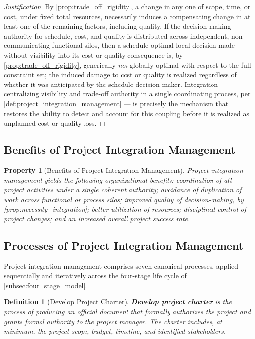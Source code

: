 \documentclass[12pt, a4paper]{report}
\theoremstyle{engnotes}
\newtheorem{defn}{Definition}[section]
\newtheorem{property}{Property}[section]
\begin{document}
\begin{proof}[Justification]
    By \cref{prop:trade_off_rigidity}, a change in any one of scope, time, or cost, under fixed total resources, necessarily induces a compensating change in at least one of the remaining factors, including quality. If the decision-making authority for schedule, cost, and quality is distributed across independent, non-communicating functional silos, then a schedule-optimal local decision made without visibility into its cost or quality consequence is, by \cref{prop:trade_off_rigidity}, generically \emph{not} globally optimal with respect to the full constraint set; the induced damage to cost or quality is realized regardless of whether it was anticipated by the schedule decision-maker. Integration --- centralizing visibility and trade-off authority in a single coordinating process, per \cref{def:project_integration_management} --- is precisely the mechanism that restores the ability to detect and account for this coupling before it is realized as unplanned cost or quality loss.
\end{proof}

\subsection{Benefits of Project Integration Management}
\label{subsec:pim_benefits}

\begin{property}[Benefits of Project Integration Management]\label{pty:pim_benefits}
    Project integration management yields the following organizational benefits: coordination of all project activities under a single coherent authority; avoidance of duplication of work across functional or process silos; improved quality of decision-making, by \cref{prop:necessity_integration}; better utilization of resources; disciplined control of project changes; and an increased overall project success rate.
\end{property}

\subsection{Processes of Project Integration Management}
\label{subsec:pim_processes}

Project integration management comprises seven canonical processes, applied sequentially and iteratively across the four-stage life cycle of \cref{subsec:four_stage_model}.

\begin{defn}[Develop Project Charter]\label{def:develop_project_charter}
    \textbf{Develop project charter} is the process of producing an official document that formally authorizes the project and grants formal authority to the project manager. The charter includes, at minimum, the project scope, budget, timeline, and identified stakeholders.
\end{defn}
\end{document}
